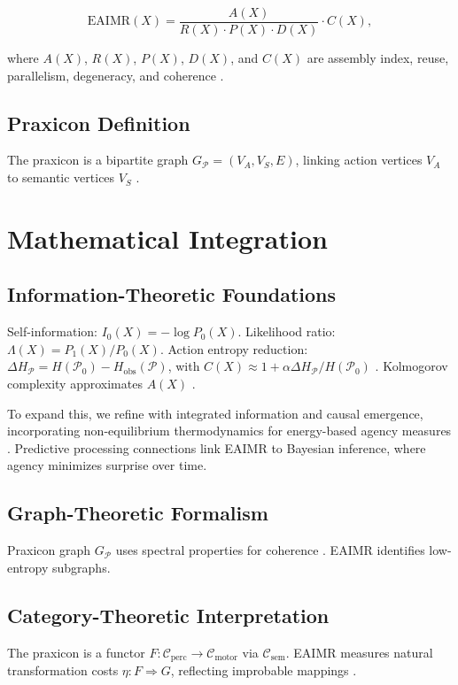 \documentclass{article}
\begin{document}
\[
\text{EAIMR}(X) = \frac{A(X)}{R(X) \cdot P(X) \cdot D(X)} \cdot C(X),
\]

where \(A(X)\), \(R(X)\), \(P(X)\), \(D(X)\), and \(C(X)\) are assembly index, reuse, parallelism, degeneracy, and coherence \citep{walker2013algorithmic}.

\subsection{Praxicon Definition}
The praxicon is a bipartite graph \(G_{\mathcal{P}} = (V_A, V_S, E)\), linking action vertices \(V_A\) to semantic vertices \(V_S\) \citep{panunzi2018imagact, barsalou2008grounded}.

\section{Mathematical Integration}
\label{sec:integration}

\subsection{Information-Theoretic Foundations}
Self-information: \(I_0(X) = -\log P_0(X)\). Likelihood ratio: \(\Lambda(X) = P_1(X)/P_0(X)\). Action entropy reduction: \(\Delta H_{\mathcal{P}} = H(\mathcal{P}_0) - H_{\text{obs}}(\mathcal{P})\), with \(C(X) \approx 1 + \alpha \Delta H_{\mathcal{P}} / H(\mathcal{P}_0)\) \citep{shannon1948mathematical, jaynes2003probability}. Kolmogorov complexity approximates \(A(X)\) \citep{kolmogorov1965three}.

To expand this, we refine with integrated information \citep{tononi2004information} and causal emergence, incorporating non-equilibrium thermodynamics for energy-based agency measures \citep{friston2010free}. Predictive processing connections link EAIMR to Bayesian inference, where agency minimizes surprise over time.

\subsection{Graph-Theoretic Formalism}
Praxicon graph \(G_{\mathcal{P}}\) uses spectral properties for coherence \citep{newell1990unified}. EAIMR identifies low-entropy subgraphs.

\subsection{Category-Theoretic Interpretation}
The praxicon is a functor \(F: \mathcal{C}_{\text{perc}} \to \mathcal{C}_{\text{motor}}\) via \(\mathcal{C}_{\text{sem}}\). EAIMR measures natural transformation costs \(\eta: F \Rightarrow G\), reflecting improbable mappings \citep{healy2022, ehresmann2021}.
\end{document}
